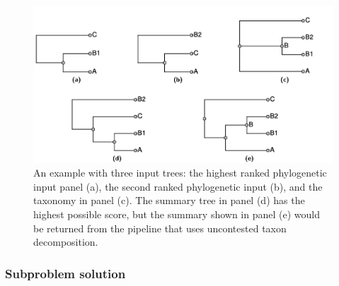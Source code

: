 \documentclass[fleqn,12pt,lineno,english]{wlpeerj}
\providecommand{\DIFaddbeginFL}{} %
\providecommand{\DIFaddendFL}{} %
\providecommand{\DIFdelbeginFL}{} %
\providecommand{\DIFdelendFL}{} %
\begin{document}
\begin{figure}
\DIFdelbeginFL %






\DIFdelendFL \DIFaddbeginFL \includegraphics[width=1.0\textwidth]{Fig7}
\DIFaddendFL 

\caption{An example with three input trees: the highest ranked phylogenetic
input panel (a), the second ranked phylogenetic input (b), and the
taxonomy in panel (c). The summary tree in panel (d) has the highest
possible score, but the summary shown in panel (e) would be returned
from the pipeline that uses uncontested taxon decomposition.}
\label{fig:decompose-worsens}
\end{figure}


\subsubsection{Subproblem solution\label{subsec:Subproblem-solution}}
\end{document}
